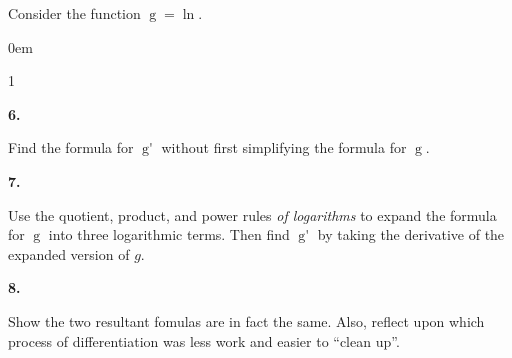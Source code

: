 \documentclass[12pt,]{book}
\theoremstyle{plain}
\theoremstyle{definition}
\numberwithin{equation}{section}
\newenvironment{exercisegroup}%
{\medskip\noindent}%
{\par\bigskip}%
\newlength{\exercisegroupindent}%
\newlength{\exercisegroupitemwidth}%
\newenvironment{exercisegrouplist}%
{\vspace{-\partopsep}%
\begin{adjustwidth}{\exercisegroupindent}{0em}}%
{\end{adjustwidth}%
\vspace{-\partopsep}%
\vspace{\baselineskip}}%
\newenvironment{exercisegroupbycol}[1]%
{\begin{exercisegrouplist}%
\vspace{-\multicolsep}%
\begin{multicols}{#1}%
\setlength{\parindent}{0em}%
\setlength{\exercisegroupitemwidth}{\linewidth}}%
{\end{multicols}%
\vspace{-\multicolsep}%
\end{exercisegrouplist}}%
\newenvironment{exercisegroupitem}[1]%
{\begin{minipage}[t]{\exercisegroupitemwidth}
\vspace{0pt}%
{\bfseries#1}%
\rule{0pt}{\baselineskip}}{\strut%
\end{minipage}%
\hspace{\columnsep}}%
\providecommand\phantomsection{}
\newcommand{\fe}[2]{\mathop{{#1}{\left(#2\right)}}}
\newcommand{\fd}[1]{#1'}
\begin{document}
\begin{exercisegroup}%
Consider the function \(\fe{g}{t}=\fe{\ln}{\frac{5}{t^3\fe{\sec}{t}}}\).%
\par
\begin{exercisegroupbycol}{1}%
\begin{exercisegroupitem}{6. }\phantomsection\hypertarget{exercise-362}{\null}
Find the formula for \(\fe{\fd{g}}{t}\) without first simplifying the formula for \(\fe{g}{t}\).%
\end{exercisegroupitem}%
\par%
\begin{exercisegroupitem}{7. }\phantomsection\hypertarget{exercise-363}{\null}
Use the quotient, product, and power rules \emph{of logarithms} to expand the formula for \(\fe{g}{t}\) into three logarithmic terms.  Then find \(\fe{\fd{g}}{t}\) by taking the derivative of the expanded version of \(g\). %
\end{exercisegroupitem}%
\par%
\begin{exercisegroupitem}{8. }\phantomsection\hypertarget{exercise-364}{\null}
Show the two resultant fomulas are in fact the same. Also, reflect upon which process of differentiation was less work and easier to ``clean up''.%
\end{exercisegroupitem}%
\par%
\end{exercisegroupbycol}%
\end{exercisegroup}%
\typeout{************************************************}
\typeout{************************************************}
\end{document}
